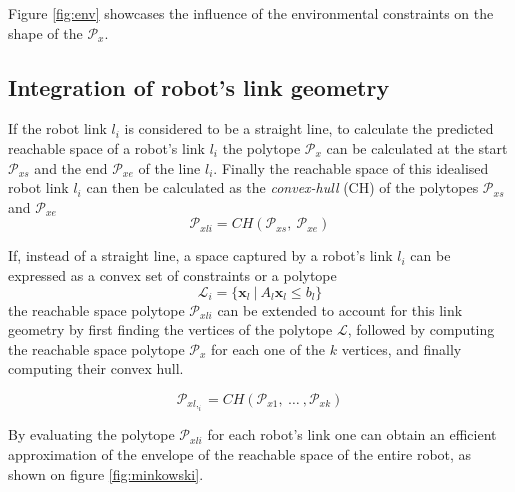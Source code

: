 Figure \ref{fig:env} showcases the influence of the environmental constraints on the shape of the $\mathcal{P}_x$.


\vspace{-0.2cm}
\subsection{Integration of robot's link geometry}

If the robot link $l_i$ is considered to be a straight line, to calculate the predicted reachable space of a robot's link $l_i$ the polytope $\mathcal{P}_x$ can be calculated at the start $\mathcal{P}_{xs}$ and the end $\mathcal{P}_{xe}$ of the line $l_i$.  Finally the reachable space of this idealised robot link $l_i$ can then be calculated as the \textit{convex-hull} (CH) of the polytopes $\mathcal{P}_{xs}$ and $\mathcal{P}_{xe}$
\begin{equation}
    \mathcal{P}_{xli} = CH \left(  \mathcal{P}_{xs}, ~ \mathcal{P}_{xe} \right)
\end{equation}

If, instead of a straight line, a space captured by a robot's link $l_i$ can be expressed as a convex set of constraints or a polytope
\begin{equation}
    \mathcal{L}_i = \Big \{ \bm{x}_l ~ |~ A_l \bm{x}_l \leq b_l \Big\}
\end{equation}
the reachable space polytope $\mathcal{P}_{xli}$ can be extended to account for this link geometry by first finding the vertices of the polytope $\mathcal{L}$, followed by computing the reachable space polytope $\mathcal{P}_{x}$ for each one of the $k$ vertices, and finally computing their convex hull. 

\begin{equation}
    \mathcal{P}_{xl,_i} = CH \left(  \mathcal{P}_{x1}, ~ \dots ~, \mathcal{P}_{xk} \right)
\end{equation}

By evaluating the polytope $\mathcal{P}_{xli}$ for each robot's link one can obtain an efficient approximation of the envelope of the reachable space of the entire robot, as shown on figure \ref{fig:minkowski}.


